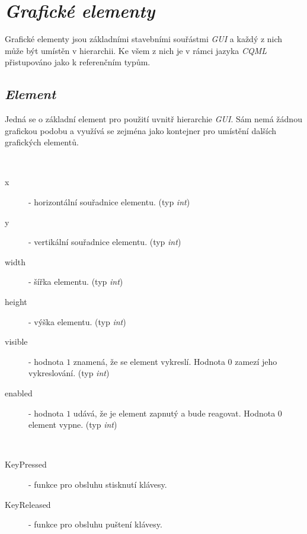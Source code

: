 \documentclass[11pt,twoside,a4paper]{book}
\begin{document}
\section{\textit{Grafické elementy}}
Grafické elementy jsou základními stavebními souřástmi \textit{GUI} a každý z nich může být umístěn v hierarchii. Ke všem z nich je v rámci jazyka \textit{CQML} přistupováno jako k referenčním typům.

\subsection{\textit{Element}}
Jedná se o základní element pro použití uvnitř hierarchie \textit{GUI}. Sám nemá žádnou grafickou podobu a využívá se zejména jako kontejner pro umístění dalších grafických elementů.\\
\begin{description}
\item[Seznam atributů:] ~
\begin{description}
\item[x] - horizontální souřadnice elementu. (typ \textit{int})
\item[y] - vertikální souřadnice elementu. (typ \textit{int})
\item[width] - šířka elementu. (typ \textit{int})
\item[height] - výška elementu. (typ \textit{int})
\item[visible] - hodnota $1$ znamená, že se element vykreslí. Hodnota $0$ zamezí jeho vykreslování. (typ \textit{int})
\item[enabled] - hodnota $1$ udává, že je element zapnutý a bude reagovat. Hodnota $0$ element vypne. (typ \textit{int})
\end{description}
\item
\item[Seznam funkcí pro obsluhu událostí:] ~
\begin{description}
\item[KeyPressed] - funkce pro obsluhu stisknutí klávesy.
\item[KeyReleased] - funkce pro obsluhu puštení klávesy.
\end{description}
\end{description}
\end{document}
